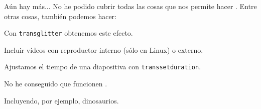 \begin{frame}{Aún hay más...}
  No he podido cubrir todas las cosas que nos permite hacer \beamer \frownie{}.
  Entre otras cosas, también podemos hacer:
  \espacio
  \begin{description}[<+->]
    \item[Transiciones] Con \texttt{transglitter} obtenemos este efecto.
    \item[Multimedia] Incluir vídeos con reproductor interno (sólo en Linux) o externo.
    \item[Temporización] Ajustamos el tiempo de una diapositiva con \texttt{transsetduration}.
    \item[Animaciones] No he conseguido que funcionen \frownie{}.
    \item[Cajas] 
    \item[Overlays de imágenes] Incluyendo, por ejemplo, dinosaurios.
  \end{description}

\end{frame}
